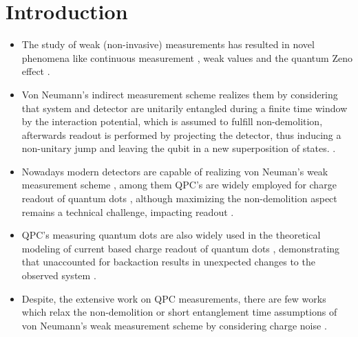 \documentclass[10pt,
 amsmath,amssymb,
 aps,prb, twocolumn
]{revtex4-2}
\newcommand\sj[1]{ {\color{cyan} #1} }
\begin{document}
\section{Introduction}\label{sect:intro}
\begin{itemize}

     \item The study of weak (non-invasive) measurements has resulted in novel phenomena like continuous measurement \cite{wisemanQuantumTrajectorie1996,bauerRepeatedNonDemolition2013}, weak values \cite{aharonov1988, alonso2005, zilberbergSensingAmplification2011, romito2012} and the quantum Zeno effect \cite{doggenzeno2023}. 
    
     \item Von Neumann's indirect measurement scheme \cite{vonNeumann1932} realizes them by considering that system and detector are unitarily entangled during a finite time window by the interaction potential, which is assumed to fulfill non-demolition, afterwards readout is performed by projecting the detector, thus inducing a non-unitary jump and leaving the qubit in a new superposition of states. \cite{tamir013}.
    
    \item Nowadays modern detectors are capable of realizing von Neuman's weak measurement scheme \cite{field1993,pilgramEfficiencyMesoscopic2002, boissonneaultDispersiveNondemo2009}, among them QPC's are widely employed for charge readout of quantum dots \cite{reillyFastSinglechargeSensing2007, peterssonOneElectron2010, vandersypenDetectionElectron2004}, \sj{although maximizing the non-demolition aspect remains a technical challenge, impacting readout} \cite{kumbhakarShotNoise2025, boissonneaultDispersiveCircuit2009}.
    
    \item QPC's measuring quantum dots are also widely used in the theoretical modeling of current based charge readout of quantum dots \cite{gurvitz1996, gurvitzQuantumDescriptionClassical2003, korotkovMeasurementDoubleDot1999}, demonstrating that unaccounted for backaction results in unexpected changes to the observed system \cite{korotkovSelectiveMeasurement2001, gurvitzZeno2003, fergusonPopulationSwitch2023, zilberbergCotunneling2014, KehreinCTAP2011, zilberbergCTAP2019}.

    \item Despite, the extensive work on QPC measurements, there are few works which relax the non-demolition or short entanglement time assumptions of von Neumann's weak measurement scheme by considering charge noise \cite{engelMeasurementEfficiency2004, svastitsReadoutSweetSpots2026,molmerQuantumNondemo2022, vaartjesMaximizingNondemo2026,youngInelasticBackaction2010}.
    

\end{itemize}
\end{document}
